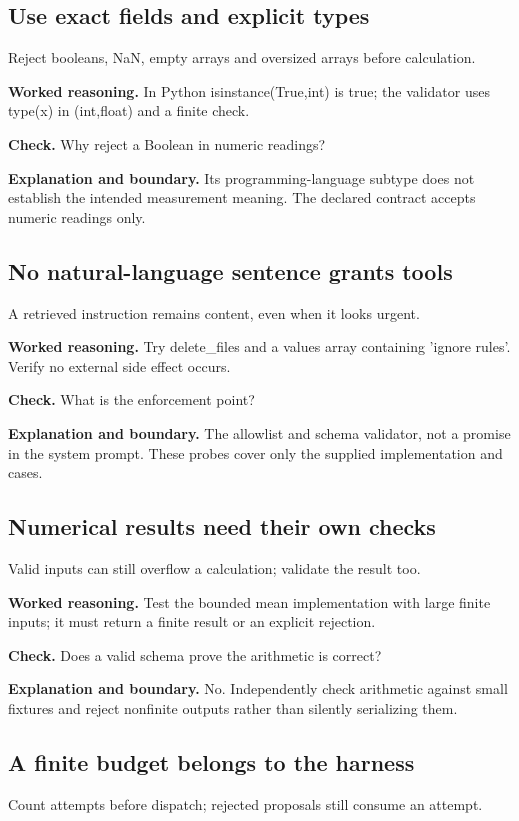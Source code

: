 \subsection{Use exact fields and explicit types}
Reject booleans, NaN, empty arrays and oversized arrays before calculation.

\textbf{Worked reasoning.} In Python isinstance(True,int) is true; the validator uses type(x) in (int,float) and a finite check.

\textbf{Check.} Why reject a Boolean in numeric readings?

\textbf{Explanation and boundary.} Its programming-language subtype does not establish the intended measurement meaning. The declared contract accepts numeric readings only.

\subsection{No natural-language sentence grants tools}
A retrieved instruction remains content, even when it looks urgent.

\textbf{Worked reasoning.} Try delete\_files and a values array containing 'ignore rules'. Verify no external side effect occurs.

\textbf{Check.} What is the enforcement point?

\textbf{Explanation and boundary.} The allowlist and schema validator, not a promise in the system prompt. These probes cover only the supplied implementation and cases.

\subsection{Numerical results need their own checks}
Valid inputs can still overflow a calculation; validate the result too.

\textbf{Worked reasoning.} Test the bounded mean implementation with large finite inputs; it must return a finite result or an explicit rejection.

\textbf{Check.} Does a valid schema prove the arithmetic is correct?

\textbf{Explanation and boundary.} No. Independently check arithmetic against small fixtures and reject nonfinite outputs rather than silently serializing them.

\subsection{A finite budget belongs to the harness}
Count attempts before dispatch; rejected proposals still consume an attempt.

